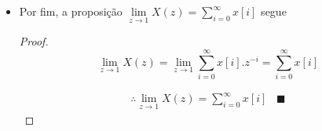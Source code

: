 \begin{enumerate}
\begin{itemize}
            	\begin{proof}
            	\begin{equation}
            	\begin{split}
            	Z\left\{\sum_{i=0}^{n}x[i] \right\} & = \sum_{n=0}^{\infty} z^{-n} \sum_{i=0}^{n} x[i-1] \\
            	& = x[-1] + z^{-1} \sum_{i=0}^{1} x[i-1] + z^{-2} \sum_{i=0}^{2} x[i-1] + \cdots \\
            	& = \underbrace{x[-1]}_{\coloneqq 0} \sum_{i=0}^{\infty} z^{-i} + x[0] \sum_{i=1}^{\infty} z^{-i} + \cdots \\
            	& = x[0] \frac{z^{-1}}{1 - z^{-1}} + x[1] \frac{z^{-2}}{1 - z^{-1}} + \cdots \\
            	& = \frac{z^{-1}}{1 - z^{-1}} \underbrace{\sum_{i=0}^{\infty} x[i].z^{-i}}_{\coloneqq X(z)}
            	\end{split}
            	\end{equation}
            
            	\begin{equation}
            	\therefore Z\left\{\sum_{i=0}^{n}x[i-1] \right\} = \frac{z^{-1}}{1-z^{-1}}.X(z) \hspace{10pt} \blacksquare
            	\end{equation}
                \end{proof}
                
            	\item Por fim, a proposição $\lim\limits_{z \rightarrow 1} X(z) = \sum_{i=0}^{\infty}x[i]$ segue
                
                \begin{proof}
            	\begin{equation}
            	\lim\limits_{z \rightarrow 1} X(z) = \lim\limits_{z \rightarrow 1} \sum_{i=0}^{\infty} x[i].z^{-i} = \sum_{i=0}^{\infty} x[i]
            	\end{equation}
            	
            	\begin{equation}
            	\begin{split}
            	\therefore \lim\limits_{z \rightarrow 1} X(z) = \sum_{i=0}^{\infty}x[i] \hspace{10pt} \blacksquare
            	\end{split}
            	\end{equation}
                \end{proof}
            	

\end{itemize}
\end{enumerate}
